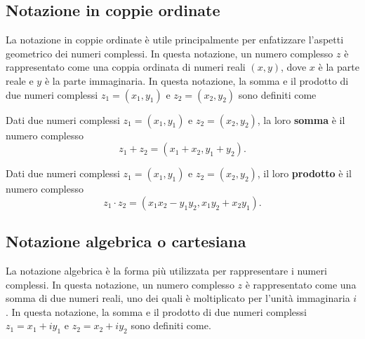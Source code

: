 \documentclass{book}
\begin{document}
\subsection{Notazione in coppie ordinate}
La notazione in coppie ordinate è utile principalmente per enfatizzare l'aspetti geometrico dei numeri complessi. In questa notazione, un numero complesso \( z \) è rappresentato come una coppia ordinata di numeri reali \( (x, y) \), dove \( x \) è la parte reale e \( y \) è la parte immaginaria. In questa notazione, la somma e il prodotto di due numeri complessi \( z_1 = (x_1, y_1) \) e \( z_2 = (x_2, y_2) \) sono definiti come
\begin{theorem}
    Dati due numeri complessi \( z_1 = (x_1, y_1) \) e \( z_2 = (x_2, y_2) \), la loro \textbf{somma} è il numero complesso
    \[ z_1 + z_2 = (x_1 + x_2, y_1 + y_2). \]
\end{theorem}
\begin{theorem}
    Dati due numeri complessi \( z_1 = (x_1, y_1) \) e \( z_2 = (x_2, y_2) \), il loro \textbf{prodotto} è il numero complesso
    \[ z_1 \cdot z_2 = (x_1 x_2 - y_1 y_2, x_1 y_2 + x_2 y_1). \]
\end{theorem}

\subsection{Notazione algebrica o cartesiana}
La notazione algebrica è la forma più utilizzata per rappresentare i numeri complessi. In questa notazione, un numero complesso \( z \) è rappresentato come una somma di due numeri reali, uno dei quali è moltiplicato per l'unità immaginaria \( i \). In questa notazione, la somma e il prodotto di due numeri complessi \( z_1 = x_1 + i y_1 \) e \( z_2 = x_2 + i y_2 \) sono definiti come.

\noindent\begin{minipage}{\textwidth}
\end{minipage}
\end{document}

